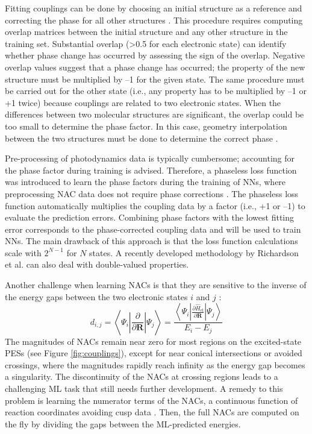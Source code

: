 \documentclass[9pt,bestpractices]{livecoms}
\begin{document}
Fitting couplings can be done by choosing an initial structure as a reference and correcting the phase for all other structures \cite{RN132}. This procedure requires computing overlap matrices between the initial structure and any other structure in the training set. Substantial overlap (>0.5 for each electronic state) can identify whether phase change has occurred by assessing the sign of the overlap. Negative overlap values suggest that a phase change has occurred; the property of the new structure must be multiplied by –1 for the given state. The same procedure must be carried out for the other state (i.e., any property has to be multiplied by –1 or +1 twice) because couplings are related to two electronic states. When the differences between two molecular structures are significant, the overlap could be too small to determine the phase factor. In this case, geometry interpolation between the two structures must be done to determine the correct phase \cite{RN132}.

Pre-processing of photodynamics data is typically cumbersome; accounting for the phase factor during training is advised. Therefore, a phaseless loss function was introduced to learn the phase factors during the training of NNs, where preprocessing NAC data does not require phase corrections \cite{RN103}. The phaseless loss function automatically multiplies the coupling data by a factor (i.e., +1 or –1) to evaluate the prediction errors. Combining phase factors with the lowest fitting error corresponds to the phase-corrected coupling data and will be used to train NNs. The main drawback of this approach is that the loss function calculations scale with $2^{N-1}$ for $N$ states. A recently developed methodology by Richardson et al. \cite{RN41} can also deal with double-valued properties.

Another challenge when learning NACs is that they are sensitive to the inverse of the energy gaps between the two electronic states $i$ and $j$ \cite{Domcke2004}:
\begin{equation}
\label{eq:NAC}
    d_{i,j} = \left< \Psi_i \left| \frac{\partial }{\partial \mathbf{R}} \right| \Psi_j\right> = \frac{\left< \Psi_i \left| \frac{\partial \hat{H}_\text{el}}{\partial \mathbf{R}} \right| \Psi_j\right>}{E_i - E_j}
\end{equation}
The magnitudes of NACs remain near zero for most regions on the excited-state PESs (see Figure \ref{fig:couplings}), except for near conical intersections or avoided crossings, where the magnitudes rapidly reach infinity as the energy gap becomes a singularity. The discontinuity of the NACs at crossing regions leads to a challenging ML task that still needs further development. A remedy to this problem is learning the numerator terms of the NACs, a continuous function of reaction coordinates avoiding cusp data \cite{RN132}. Then, the full NACs are computed on the fly by dividing the gaps between the ML-predicted energies.
\end{document}
